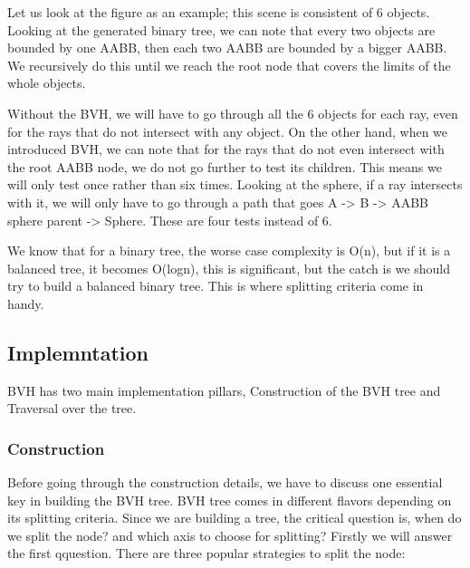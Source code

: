 \documentclass[11pt,a4paper]{article}
\begin{document}
Let us look at the figure as an example; this scene is consistent of 6 objects. Looking at the generated binary tree, we can note that every two objects are bounded by one AABB, then each two AABB are bounded by a bigger AABB. We recursively do this until we reach the root node that covers the limits of the whole objects. 
\\
\noindent

Without the BVH, we will have to go through all the 6 objects for each ray, even for the rays that do not intersect with any object. On the other hand, when we introduced BVH, we can note that for the rays that do not even intersect with the root AABB node, we do not go further to test its children. This means we will only test once rather than six times. Looking at the sphere, if a ray intersects with it, we will only have to go through a path that goes A -> B -> AABB sphere parent -> Sphere. These are four tests instead of 6. 
\\
\noindent

We know that for a binary tree, the worse case complexity is O(n), but if it is a balanced tree, it becomes O(logn), this is significant, but the catch is we should try to build a balanced binary tree. This is where splitting criteria come in handy. 


\subsection{Implemntation}
BVH has two main implementation pillars, Construction of the BVH tree and Traversal over the tree.  

\subsubsection{Construction}
Before going through the construction details, we have to discuss one essential key in building the BVH tree.  BVH tree comes in different flavors depending on its splitting criteria. Since we are building a tree, the critical question is, when do we split the node? and which axis to choose for splitting? Firstly we will answer the first qquestion. There are three popular strategies to split the node:
\end{document}

